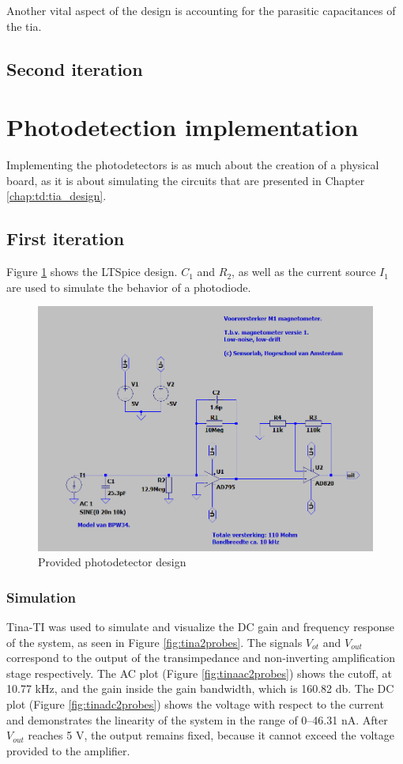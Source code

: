 Another vital aspect of the design is accounting for the parasitic capacitances of the \gls{tia}. 

\subsection{Second iteration}

\section{Photodetection implementation}
Implementing the photodetectors is as much about the creation of a physical board, as it is about simulating the circuits that are presented in Chapter \ref{chap:td:tia_design}. 


\subsection{First iteration}
Figure \ref{fig:photodetecog} shows the LTSpice design. $C_1$ and $R_2$, as well as the current source $I_1$ are used to simulate the behavior of a photodiode.

\begin{figure} [ht]
	\centering
	\includegraphics[width=0.7\linewidth]{img/photodetec_og}
	\caption{Provided photodetector design}
	\label{fig:photodetecog}
\end{figure}


\subsubsection{Simulation}
Tina-TI was used to simulate and visualize the DC gain and frequency response of the system, as seen in Figure \ref{fig:tina2probes}. The signals $V_{ot}$ and $V_{out}$ correspond to the output of the transimpedance and non-inverting amplification stage respectively. The AC plot (Figure \ref{fig:tinaac2probes}) shows the cutoff, at \num{10,77} \unit{\kilo \hertz}, and the gain inside the gain bandwidth, which is \num{160,82} \unit{\decibel}. The DC plot (Figure \ref{fig:tinadc2probes}) shows the voltage with respect to the current and demonstrates the linearity of the system in the range of \numrange{0}{46,31} \unit{\nano \ampere}. After $V_{out}$ reaches \num{5} \unit{V}, the output remains fixed, because it cannot exceed the voltage provided to the amplifier. 


